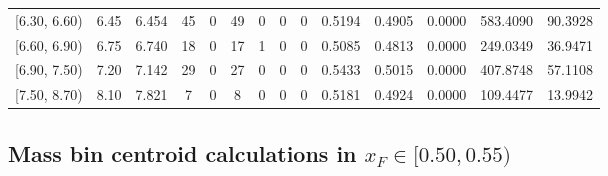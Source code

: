 \begin{table}[htbp]
{\begin{tabular}{cc|c|cccccc|ccc|cc}
        {[6.30, 6.60)} & 6.45 & 6.454 & 45 & 0 & 49 & 0 & 0 & 0 & 0.5194 & 0.4905 & 0.0000 & 583.4090 & 90.3928 \\
        {[6.60, 6.90)} & 6.75 & 6.740 & 18 & 0 & 17 & 1 & 0 & 0 & 0.5085 & 0.4813 & 0.0000 & 249.0349 & 36.9471 \\
        {[6.90, 7.50)} & 7.20 & 7.142 & 29 & 0 & 27 & 0 & 0 & 0 & 0.5433 & 0.5015 & 0.0000 & 407.8748 & 57.1108 \\
        {[7.50, 8.70)} & 8.10 & 7.821 & 7 & 0 & 8 & 0 & 0 & 0 & 0.5181 & 0.4924 & 0.0000 & 109.4477 & 13.9942 \\
        \hline\hline
    \end{tabular}
    }
\end{table}

\clearpage
\subsection{\texorpdfstring{Mass bin centroid calculations in $x_F \in [0.50, 0.55)$}{Mass bin centroid calculations in x\_F in [0.50, 0.55)]}}

